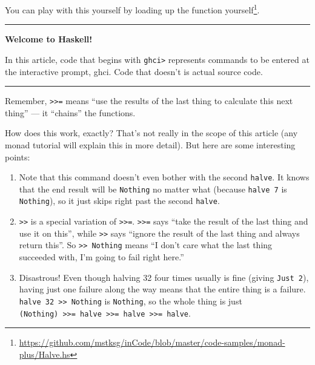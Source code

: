 \documentclass[]{article}
\renewcommand{\href}[2]{#2\footnote{\url{#1}}}
\begin{document}
You can play with this yourself by
\href{https://github.com/mstksg/inCode/blob/master/code-samples/monad-plus/Halve.hs}{loading
up the function yourself}.

\begin{center}\rule{0.5\linewidth}{\linethickness}\end{center}

\textbf{Welcome to Haskell!}

In this article, code that begins with \texttt{ghci\textgreater{}}
represents commands to be entered at the interactive prompt, ghci. Code
that doesn't is actual source code.

\begin{center}\rule{0.5\linewidth}{\linethickness}\end{center}

Remember, \texttt{\textgreater{}\textgreater{}=} means ``use the results
of the last thing to calculate this next thing'' --- it ``chains'' the
functions.

How does this work, exactly? That's not really in the scope of this
article (any monad tutorial will explain this in more detail). But here
are some interesting points:

\begin{enumerate}
\def\labelenumi{\arabic{enumi}.}
\tightlist
\item
  Note that this command doesn't even bother with the second
  \texttt{halve}. It knows that the end result will be \texttt{Nothing}
  no matter what (because \texttt{halve\ 7} is \texttt{Nothing}), so it
  just skips right past the second \texttt{halve}.
\item
  \texttt{\textgreater{}\textgreater{}} is a special variation of
  \texttt{\textgreater{}\textgreater{}=}.
  \texttt{\textgreater{}\textgreater{}=} says ``take the result of the
  last thing and use it on this'', while
  \texttt{\textgreater{}\textgreater{}} says ``ignore the result of the
  last thing and always return this''. So
  \texttt{\textgreater{}\textgreater{}\ Nothing} means ``I don't care
  what the last thing succeeded with, I'm going to fail right here.''
\item
  Disastrous! Even though halving 32 four times usually is fine (giving
  \texttt{Just\ 2}), having just one failure along the way means that
  the entire thing is a failure.
  \texttt{halve\ 32\ \textgreater{}\textgreater{}\ Nothing} is
  \texttt{Nothing}, so the whole thing is just
  \texttt{(Nothing)\ \textgreater{}\textgreater{}=\ halve\ \textgreater{}\textgreater{}=\ halve\ \textgreater{}\textgreater{}=\ halve}.
\end{enumerate}
\end{document}
